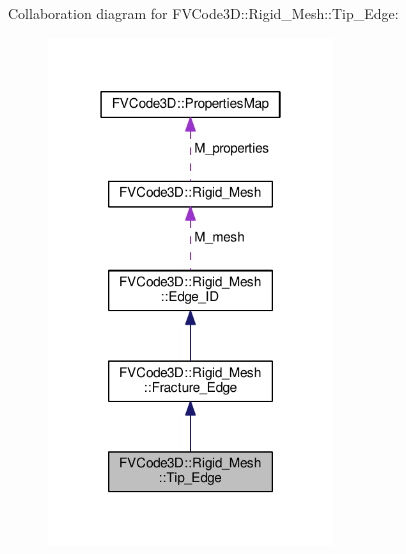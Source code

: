 Collaboration diagram for F\+V\+Code3D\+:\+:Rigid\+\_\+\+Mesh\+:\+:Tip\+\_\+\+Edge\+:
\nopagebreak
\begin{figure}[H]
\begin{center}
\leavevmode
\includegraphics[width=214pt]{classFVCode3D_1_1Rigid__Mesh_1_1Tip__Edge__coll__graph}
\end{center}
\end{figure}
